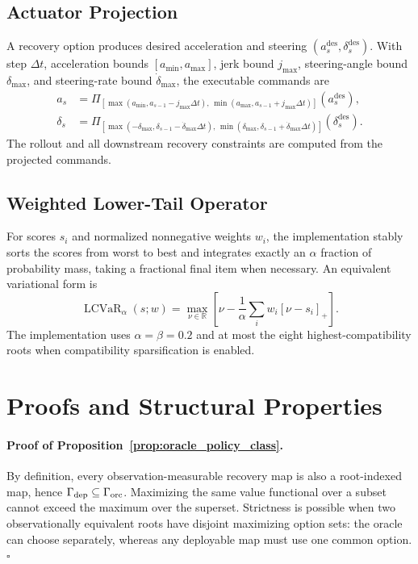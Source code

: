 \documentclass{article} %
\DeclareMathOperator{\LCVaR}{LCVaR}
\begin{document}
\subsection{Actuator Projection}
\label{app:projection}
A recovery option produces desired acceleration and steering $(a_s^{\mathrm{des}},\delta_s^{\mathrm{des}})$. With step $\Delta t$, acceleration bounds $[a_{\min},a_{\max}]$, jerk bound $j_{\max}$, steering-angle bound $\delta_{\max}$, and steering-rate bound $\dot\delta_{\max}$, the executable commands are
\begin{align}
 a_s &= \Pi_{[\max(a_{\min},a_{s-1}-j_{\max}\Delta t),\,\min(a_{\max},a_{s-1}+j_{\max}\Delta t)]}(a_s^{\mathrm{des}}),\\
 \delta_s &= \Pi_{[\max(-\delta_{\max},\delta_{s-1}-\dot\delta_{\max}\Delta t),\,\min(\delta_{\max},\delta_{s-1}+\dot\delta_{\max}\Delta t)]}(\delta_s^{\mathrm{des}}).
\end{align}
The rollout and all downstream recovery constraints are computed from the projected commands.

\subsection{Weighted Lower-Tail Operator}
\label{app:lcvar}
For scores $s_i$ and normalized nonnegative weights $w_i$, the implementation stably sorts the scores from worst to best and integrates exactly an $\alpha$ fraction of probability mass, taking a fractional final item when necessary. An equivalent variational form is
\begin{equation}
 \LCVaR_{\alpha}(s;w)=\max_{\nu\in\mathbb R}\left[\nu-\frac{1}{\alpha}\sum_iw_i[\nu-s_i]_+\right].
 \label{eq:lcvar_variational}
\end{equation}
The implementation uses $\alpha=\beta=0.2$ and at most the eight highest-compatibility roots when compatibility sparsification is enabled.

\section{Proofs and Structural Properties}
\label{app:proofs}

\paragraph{Proof of Proposition~\ref{prop:oracle_policy_class}.}
By definition, every observation-measurable recovery map is also a root-indexed map, hence $\Gamma_{\rm dep}\subseteq\Gamma_{\rm orc}$. Maximizing the same value functional over a subset cannot exceed the maximum over the superset. Strictness is possible when two observationally equivalent roots have disjoint maximizing option sets: the oracle can choose separately, whereas any deployable map must use one common option. \hfill$\square$
\end{document}
